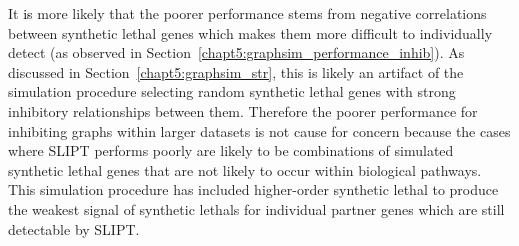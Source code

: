 It \textcolor{black}{is} more likely that the poorer performance stems from negative correlations between \gls{synthetic lethal} genes which makes them more difficult to individually detect (as observed in Section~\ref{chapt5:graphsim_performance_inhib}). As discussed in Section~\ref{chapt5:graphsim_str}, this is likely an artifact of the simulation procedure selecting random \gls{synthetic lethal} genes with strong inhibitory relationships between them. Therefore the poorer performance for inhibiting \glspl{graph} within larger datasets is not cause for concern because the cases where \gls{SLIPT} performs poorly are likely to be combinations of simulated \gls{synthetic lethal} genes that are not likely to occur within biological pathways. This simulation procedure has included higher-order \gls{synthetic lethal} to produce the weakest signal of \glspl{synthetic lethal} for individual partner genes which are still detectable by \gls{SLIPT}.



\FloatBarrier

